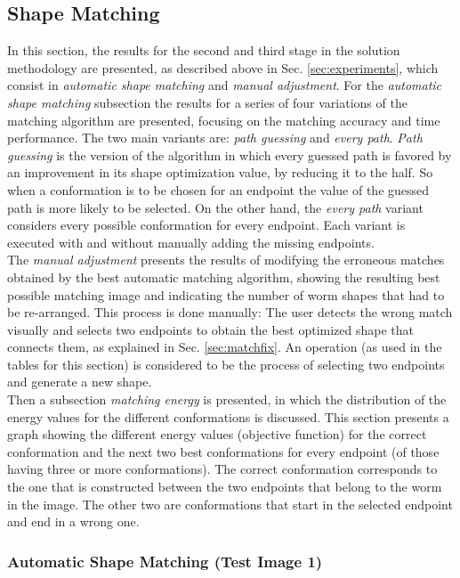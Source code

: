 \subsection{Shape Matching}

In this section, the results for the second and third stage in the 
solution methodology are presented, as described above in Sec. \ref{sec:experiments}, which consist
in \emph{automatic shape matching} and \emph{manual adjustment}. 
For the \emph{automatic shape matching} subsection the results for a series of four 
variations of the matching algorithm are presented, focusing on the matching accuracy 
and time performance. The two main variants are: \emph{path guessing} and 
\emph{every path}. 
\emph{Path guessing} is the version of the algorithm in which every guessed path is favored
by an improvement in its shape optimization value, by reducing it to the half. So when 
a conformation is to be chosen for an endpoint the value of the guessed path is more likely
to be selected. On the other hand, the \emph{every path} variant considers every possible conformation for every endpoint.
Each variant is executed with and without manually adding the missing endpoints.\\

The \emph{manual adjustment} presents the results of modifying the erroneous matches
obtained by the best automatic matching algorithm, showing the resulting best
possible matching image and indicating the number of worm shapes that had to be 
re-arranged. This process is done manually: The user detects the wrong match visually 
and selects two endpoints to obtain the best optimized shape that connects them, as
explained in Sec. \ref{sec:matchfix}. An operation (as used in the tables for this section) 
is considered to be the process of selecting two endpoints and generate a new shape.\\

Then a subsection \emph{matching energy} is presented, in which the distribution of
the energy values for the different conformations is discussed. This section presents
a graph showing the different energy values (objective function) for the correct conformation
and the next two best conformations for every endpoint (of those having three or more conformations). 
The correct conformation corresponds to the one that is constructed between the two endpoints that
belong to the worm in the image. The other two are conformations that start in the
selected endpoint and end in a wrong one.


\subsubsection*{Automatic Shape Matching (Test Image 1)}

